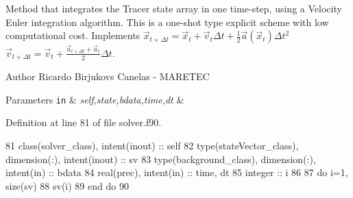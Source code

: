 Method that integrates the Tracer state array in one time-\/step, using a Velocity Euler integration algorithm. This is a one-\/shot type explicit scheme with low computational cost. Implements $ {\vec {x}}_{t+\Delta t}={\vec {x}}_{t}+{\vec {v}}_{t}\Delta t+{\frac {1}{2}}{\vec {a}}({\vec {x}}_{t})\Delta t^{2}$ $ {\vec {v}}_{t+\Delta t}={\vec {v}}_{t}+\frac{{\vec {a}}_{t+\Delta t}+{\vec {a}}_{t}}{2}\Delta t$. 

\begin{DoxyAuthor}{Author}
Ricardo Birjukovs Canelas -\/ M\+A\+R\+E\+T\+EC 
\end{DoxyAuthor}

\begin{DoxyParams}[1]{Parameters}
\mbox{\tt in}  & {\em self,state,bdata,time,dt} & \\
\hline
\end{DoxyParams}


Definition at line 81 of file solver.\+f90.


\begin{DoxyCode}
81     \textcolor{keywordtype}{class}(solver\_class), \textcolor{keywordtype}{intent(inout)} :: self
82     \textcolor{keywordtype}{type}(stateVector\_class), \textcolor{keywordtype}{dimension(:)}, \textcolor{keywordtype}{intent(inout)} :: sv
83     \textcolor{keywordtype}{type}(background\_class), \textcolor{keywordtype}{dimension(:)}, \textcolor{keywordtype}{intent(in)} :: bdata
84     \textcolor{keywordtype}{real(prec)}, \textcolor{keywordtype}{intent(in)} :: time, dt
85     \textcolor{keywordtype}{integer} :: i
86 
87     \textcolor{keywordflow}{do} i=1, \textcolor{keyword}{size}(sv)
88         sv(i)%
89 \textcolor{keywordflow}{    end do}
90     
\end{DoxyCode}
